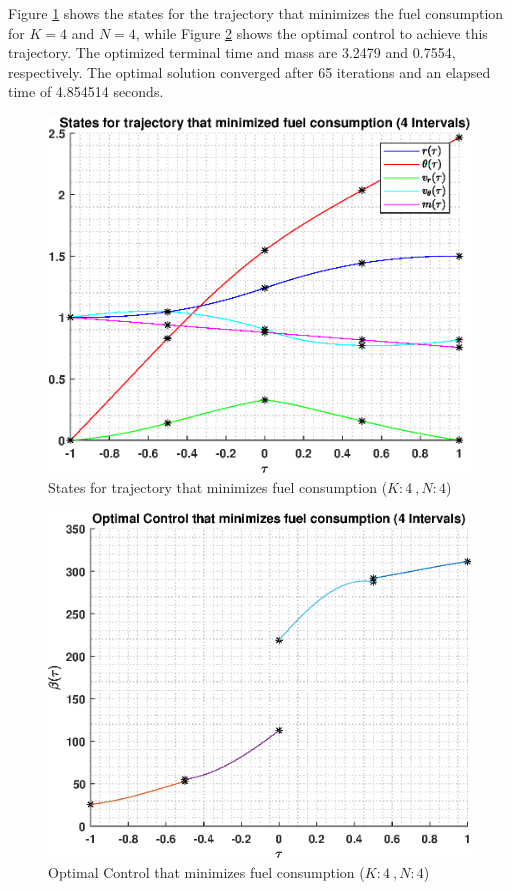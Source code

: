 \documentclass[]{article}
\begin{document}
\vspace{2mm}\newline 
Figure \ref{fig:directStatesK4Poly4} shows the states for the trajectory that minimizes the fuel consumption for \(K = 4\) and  \(N = 4\), while Figure \ref{fig:directControlK4Poly4} shows the optimal control to achieve this trajectory. The optimized terminal time and mass are 3.2479 and 0.7554, respectively. The optimal solution converged after 65 iterations and an elapsed time of 4.854514 seconds.
\begin{figure}
	\centering
	\includegraphics[scale=0.75]{directStatesK4Poly4.eps}
	\caption{States for trajectory that minimizes fuel consumption (\(K:4\ , N:4\))}
	\label{fig:directStatesK4Poly4}
\end{figure}
\begin{figure}
	\centering
	\includegraphics[scale=0.75]{directControlK4Poly4.eps}
	\caption{Optimal Control that minimizes fuel consumption (\(K:4\ , N:4\))}
	\label{fig:directControlK4Poly4}
\end{figure}
\end{document}
